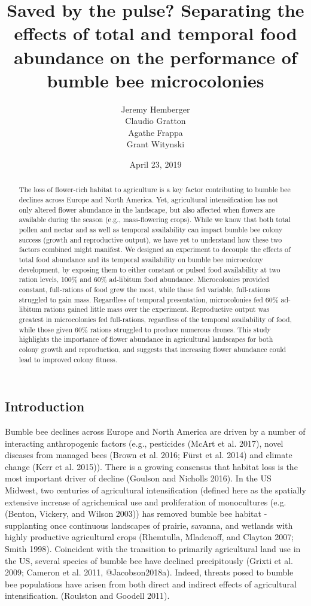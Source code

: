 \documentclass[11pt,]{article}
\title{Saved by the pulse? Separating the effects of total and temporal food
abundance on the performance of bumble bee microcolonies}
\author{Jeremy Hemberger \\ Claudio Gratton \\ Agathe Frappa \\ Grant Witynski}
\date{April 23, 2019}
\begin{document}
\maketitle
\begin{abstract}
The loss of flower-rich habitat to agriculture is a key factor
contributing to bumble bee declines across Europe and North America.
Yet, agricultural intensification has not only altered flower abundance
in the landscape, but also affected when flowers are available during
the season (e.g., mass-flowering crops). While we know that both total
pollen and nectar and as well as temporal availability can impact bumble
bee colony success (growth and reproductive output), we have yet to
understand how these two factors combined might manifest. We designed an
experiment to decouple the effects of total food abundance and its
temporal availability on bumble bee microcolony development, by exposing
them to either constant or pulsed food availability at two ration
levels, 100\% and 60\% ad-libitum food abundance. Microcolonies provided
constant, full-rations of food grew the most, while those fed variable,
full-rations struggled to gain mass. Regardless of temporal
presentation, microcolonies fed 60\% ad-libitum rations gained little
mass over the experiment. Reproductive output was greatest in
microcolonies fed full-rations, regardless of the temporal availability
of food, while those given 60\% rations struggled to produce numerous
drones. This study highlights the importance of flower abundance in
agricultural landscapes for both colony growth and reproduction, and
suggests that increasing flower abundance could lead to improved colony
fitness.
\end{abstract}

\hypertarget{introduction}{%
\subsection{Introduction}\label{introduction}}

Bumble bee declines across Europe and North America are driven by a
number of interacting anthropogenic factors (e.g., pesticides (McArt et
al. 2017), novel diseases from managed bees (Brown et al. 2016; Fürst et
al. 2014) and climate change (Kerr et al. 2015)). There is a growing
consensus that habitat loss is the most important driver of decline
(Goulson and Nicholls 2016). In the US Midwest, two centuries of
agricultural intensification (defined here as the spatially extensive
increase of agrichemical use and proliferation of monocultures
(e.g.(Benton, Vickery, and Wilson 2003)) has removed bumble bee habitat
- supplanting once continuous landscapes of prairie, savanna, and
wetlands with highly productive agricultural crops (Rhemtulla,
Mladenoff, and Clayton 2007; Smith 1998). Coincident with the transition
to primarily agricultural land use in the US, several species of bumble
bee have declined precipitously (Grixti et al. 2009; Cameron et al.
2011, @Jacobson2018a). Indeed, threats posed to bumble bee populations
have arisen from both direct and indirect effects of agricultural
intensification. (Roulston and Goodell 2011).
\end{document}
